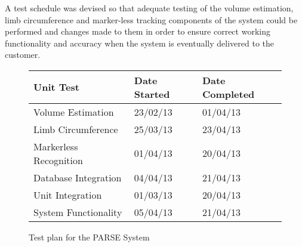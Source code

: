 A test schedule was devised so that adequate testing of the volume estimation, limb circumference and marker-less tracking components of the system could be performed and changes made to them in order to ensure correct working functionality and accuracy when the system is eventually delivered to the customer. 

\begin{figure}
\centering
\begin{tabular}[htb]{| l | l | l |}
    \hline
    Unit Test & Date Started & Date Completed \\ \hline \hline
    Volume Estimation & 23/02/13 & 01/04/13 \\ \hline
    Limb Circumference & 25/03/13 & 23/04/13 \\ \hline
    Markerless Recognition & 01/04/13 & 20/04/13 \\ \hline
    Database Integration & 04/04/13 & 21/04/13 \\ \hline
    Unit Integration & 01/03/13 & 20/04/13 \\ \hline
    System Functionality & 05/04/13 & 21/04/13 \\ \hline
\end{tabular}

\caption{Test plan for the PARSE System}
\end{figure}

